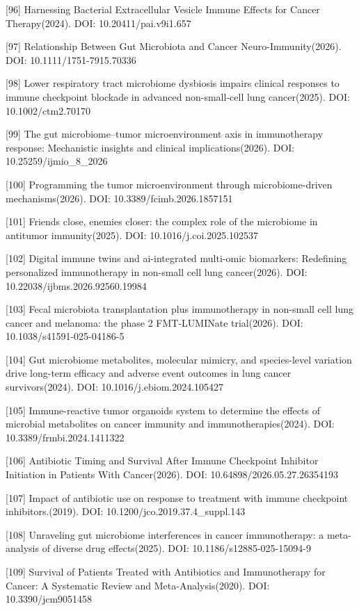 \documentclass[11pt]{article}
\begin{document}
{[}96{]} Harnessing Bacterial Extracellular Vesicle Immune Effects for Cancer Therapy(2024). DOI: 10.20411/pai.v9i1.657

{[}97{]} Relationship Between Gut Microbiota and Cancer Neuro-Immunity(2026). DOI: 10.1111/1751-7915.70336

{[}98{]} Lower respiratory tract microbiome dysbiosis impairs clinical responses to immune checkpoint blockade in advanced non-small-cell lung cancer(2025). DOI: 10.1002/ctm2.70170

{[}99{]} The gut microbiome--tumor microenvironment axis in immunotherapy response: Mechanistic insights and clinical implications(2026). DOI: 10.25259/ijmio\_8\_2026

{[}100{]} Programming the tumor microenvironment through microbiome-driven mechanisms(2026). DOI: 10.3389/fcimb.2026.1857151

{[}101{]} Friends close, enemies closer: the complex role of the microbiome in antitumor immunity(2025). DOI: 10.1016/j.coi.2025.102537

{[}102{]} Digital immune twins and ai-integrated multi-omic biomarkers: Redefining personalized immunotherapy in non-small cell lung cancer(2026). DOI: 10.22038/ijbms.2026.92560.19984

{[}103{]} Fecal microbiota transplantation plus immunotherapy in non-small cell lung cancer and melanoma: the phase 2 FMT-LUMINate trial(2026). DOI: 10.1038/s41591-025-04186-5

{[}104{]} Gut microbiome metabolites, molecular mimicry, and species-level variation drive long-term efficacy and adverse event outcomes in lung cancer survivors(2024). DOI: 10.1016/j.ebiom.2024.105427

{[}105{]} Immune-reactive tumor organoids system to determine the effects of microbial metabolites on cancer immunity and immunotherapies(2024). DOI: 10.3389/frmbi.2024.1411322

{[}106{]} Antibiotic Timing and Survival After Immune Checkpoint Inhibitor Initiation in Patients With Cancer(2026). DOI: 10.64898/2026.05.27.26354193

{[}107{]} Impact of antibiotic use on response to treatment with immune checkpoint inhibitors.(2019). DOI: 10.1200/jco.2019.37.4\_suppl.143

{[}108{]} Unraveling gut microbiome interferences in cancer immunotherapy: a meta-analysis of diverse drug effects(2025). DOI: 10.1186/s12885-025-15094-9

{[}109{]} Survival of Patients Treated with Antibiotics and Immunotherapy for Cancer: A Systematic Review and Meta-Analysis(2020). DOI: 10.3390/jcm9051458
\end{document}
